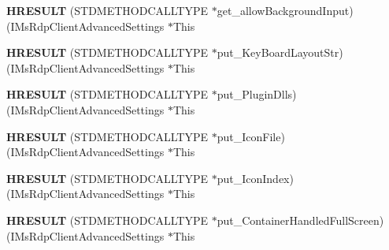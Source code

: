 \begin{DoxyCompactItemize}
\item 
\mbox{\label{struct_i_ms_rdp_client_advanced_settings_vtbl_a241bcf169ccc3b0f29db89cdd1256a67}} 
{\bfseries H\+R\+E\+S\+U\+LT} (S\+T\+D\+M\+E\+T\+H\+O\+D\+C\+A\+L\+L\+T\+Y\+PE $\ast$get\+\_\+allow\+Background\+Input)(I\+Ms\+Rdp\+Client\+Advanced\+Settings $\ast$This
\item 
\mbox{\label{struct_i_ms_rdp_client_advanced_settings_vtbl_ab4fa853b5d4a0c782a3d9764e8f26ed2}} 
{\bfseries H\+R\+E\+S\+U\+LT} (S\+T\+D\+M\+E\+T\+H\+O\+D\+C\+A\+L\+L\+T\+Y\+PE $\ast$put\+\_\+\+Key\+Board\+Layout\+Str)(I\+Ms\+Rdp\+Client\+Advanced\+Settings $\ast$This
\item 
\mbox{\label{struct_i_ms_rdp_client_advanced_settings_vtbl_a386533bf037099b2b8526768195f66fe}} 
{\bfseries H\+R\+E\+S\+U\+LT} (S\+T\+D\+M\+E\+T\+H\+O\+D\+C\+A\+L\+L\+T\+Y\+PE $\ast$put\+\_\+\+Plugin\+Dlls)(I\+Ms\+Rdp\+Client\+Advanced\+Settings $\ast$This
\item 
\mbox{\label{struct_i_ms_rdp_client_advanced_settings_vtbl_a25d978b9e454a028b6e317fe94bfa5fd}} 
{\bfseries H\+R\+E\+S\+U\+LT} (S\+T\+D\+M\+E\+T\+H\+O\+D\+C\+A\+L\+L\+T\+Y\+PE $\ast$put\+\_\+\+Icon\+File)(I\+Ms\+Rdp\+Client\+Advanced\+Settings $\ast$This
\item 
\mbox{\label{struct_i_ms_rdp_client_advanced_settings_vtbl_a908fb0d422151b3684ba9a040001f239}} 
{\bfseries H\+R\+E\+S\+U\+LT} (S\+T\+D\+M\+E\+T\+H\+O\+D\+C\+A\+L\+L\+T\+Y\+PE $\ast$put\+\_\+\+Icon\+Index)(I\+Ms\+Rdp\+Client\+Advanced\+Settings $\ast$This
\item 
\mbox{\label{struct_i_ms_rdp_client_advanced_settings_vtbl_a7d6ca4b8a392d578ae1efdcc0c21e520}} 
{\bfseries H\+R\+E\+S\+U\+LT} (S\+T\+D\+M\+E\+T\+H\+O\+D\+C\+A\+L\+L\+T\+Y\+PE $\ast$put\+\_\+\+Container\+Handled\+Full\+Screen)(I\+Ms\+Rdp\+Client\+Advanced\+Settings $\ast$This
\item 
\mbox{\label{struct_i_ms_rdp_client_advanced_settings_vtbl_acc2f011207e53d088731cfcff7f5ddd0}} 

\end{DoxyCompactItemize}
